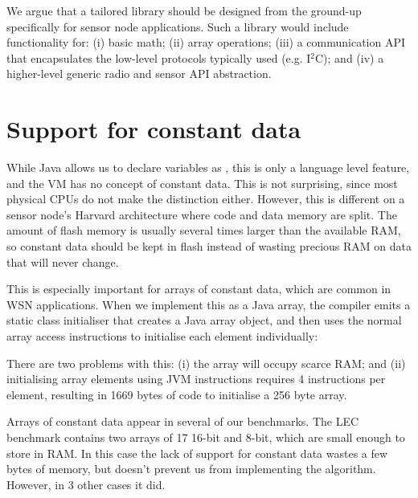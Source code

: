 We argue that a tailored library should be designed from the ground-up specifically for sensor node applications. Such a library would include functionality for: (i) basic math; (ii) array operations; (iii) a communication API that encapsulates the low-level protocols typically used (e.g. I$^{2}$C); and (iv) a higher-level generic radio and sensor API abstraction.




\section{Support for constant data}
\label{sec-const-data}
While Java allows us to declare variables as , this is only a language level feature, and the VM has no concept of constant data. This is not surprising, since most physical CPUs do not make the distinction either. However, this is different on a sensor node's Harvard architecture where code and data memory are split. The amount of flash memory is usually several times larger than the available RAM, so constant data should be kept in flash instead of wasting precious RAM on data that will never change.

This is especially important for arrays of constant data, which are common in WSN applications. When we implement this as a  Java array, the compiler emits a static class initialiser that creates a Java array object, and then uses the normal array access instructions to initialise each element individually:


There are two problems with this: (i) the array will occupy scarce RAM; and (ii) initialising array elements using JVM instructions requires 4 instructions per element, resulting in 1669 bytes of code to initialise a 256 byte array.

Arrays of constant data appear in several of our benchmarks. The LEC benchmark contains two arrays of 17 16-bit and 8-bit, which are small enough to store in RAM. In this case the lack of support for constant data wastes a few bytes of memory, but doesn't prevent us from implementing the algorithm. However, in 3 other cases it did.

